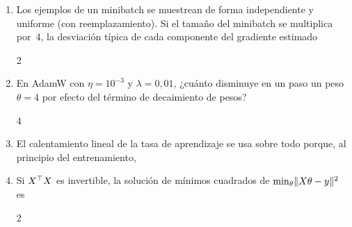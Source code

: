 \begin{enumerate}[label=\textbf{\arabic*.},leftmargin=2em,itemsep=8pt,ref=\arabic*]
\item\label{q:3}  Los ejemplos de un minibatch se muestrean de forma independiente y uniforme (con reemplazamiento). Si el tamaño del minibatch se multiplica por~4, la desviación típica de cada componente del gradiente estimado
\begin{multicols}{2}
\end{multicols}

\item\label{q:4}  En AdamW con $\eta=10^{-3}$ y $\lambda=0{,}01$, ¿cuánto disminuye en un paso un peso $\theta=4$ por efecto del término de decaimiento de pesos?
\begin{multicols}{4}
\end{multicols}

\item\label{q:5}  El calentamiento lineal de la tasa de aprendizaje se usa sobre todo porque, al principio del entrenamiento,

\item\label{q:6}  Si $X^{\top} X$ es invertible, la solución de mínimos cuadrados de $\min_\theta\lVert X\theta-y\rVert^{2}$ es
\begin{multicols}{2}
\end{multicols}


\end{enumerate}
